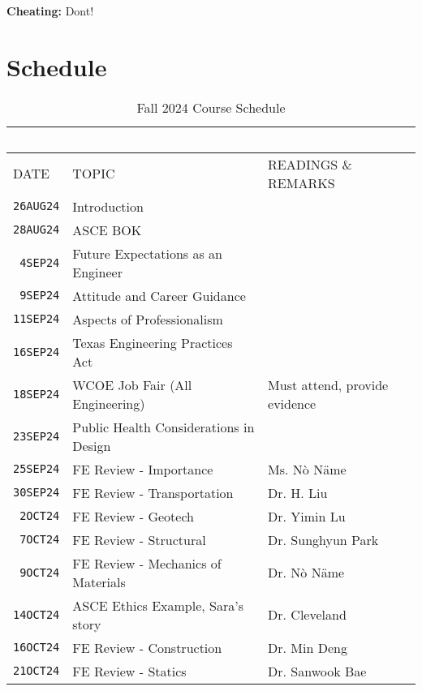 \documentclass[12pt]{article}
\begin{document}
\textbf{Cheating:} Dont!


\clearpage
\section*{Schedule}
\begin{table}[ht!]
   \centering
   \caption{Fall 2024 Course Schedule}
   \begin{tabular}{p{0.5in}p{2.5in}p{4.0in}} 
   ~ & ~ & ~  \\
\hline
DATE & TOPIC & READINGS \& REMARKS  \\
\hline
\texttt{26AUG24} & Introduction &   \\ %
\texttt{28AUG24} & ASCE BOK &  \cite{ASCE2019}\\ %
\texttt{~4SEP24} & Future Expectations as an Engineer & \\ %
\texttt{~9SEP24} & Attitude and Career Guidance &  \cite{Attitude2024} \\ %
\texttt{11SEP24} & Aspects of Professionalism   &  \cite{Lawson2004}\\ %
\texttt{16SEP24} & Texas Engineering Practices Act & \cite{TEPA2021}\\ %
\texttt{18SEP24} & WCOE Job Fair (All Engineering)   & Must attend, provide evidence\\ %
\texttt{23SEP24} & Public Health Considerations in Design & \cite{TEPAPE2021}\\ %
\texttt{25SEP24} & FE Review - Importance &  Ms. N\`o N\"ame  \\  %
\texttt{30SEP24} & FE Review - Transportation & Dr. H. Liu \cite{NCEES2020}  \cite{Lindeburg2017}\\ %
\texttt{~2OCT24} & FE Review - Geotech & Dr. Yimin Lu \cite{NCEES2020}  \cite{Lindeburg2017}\\ %
\texttt{~7OCT24} & FE Review - Structural & Dr. Sunghyun Park \cite{NCEES2020}  \cite{Lindeburg2017}\\ %
\texttt{~9OCT24} & FE Review - Mechanics of Materials & Dr. N\`o N\"ame \cite{NCEES2020}  \cite{Lindeburg2017}\\  %
\texttt{14OCT24} & ASCE Ethics Example, Sara's story  & Dr. Cleveland \cite{ASCE2019}\\ %
\texttt{16OCT24} & FE Review - Construction &  Dr. Min Deng \cite{NCEES2020}  \cite{Lindeburg2017}\\ %
\texttt{21OCT24} & FE Review - Statics  & Dr. Sanwook Bae \cite{NCEES2020}  \cite{Lindeburg2017}\\ %

\end{tabular}
\end{table}
\end{document}
